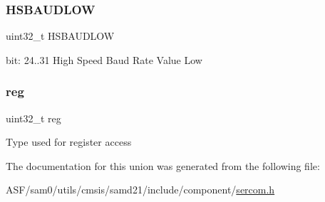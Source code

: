 \subsubsection{\texorpdfstring{HSBAUDLOW}{HSBAUDLOW}}
{\footnotesize\ttfamily uint32\+\_\+t H\+S\+B\+A\+U\+D\+L\+OW}

bit\+: 24..31 High Speed Baud Rate Value Low \mbox{\label{union_s_e_r_c_o_m___i2_c_m___b_a_u_d___type_a6b91636401516a477989a336376d7b40}} 
\subsubsection{\texorpdfstring{reg}{reg}}
{\footnotesize\ttfamily uint32\+\_\+t reg}

Type used for register access 

The documentation for this union was generated from the following file\+:\begin{DoxyCompactItemize}
\item 
A\+S\+F/sam0/utils/cmsis/samd21/include/component/\mbox{\hyperlink{utils_2cmsis_2samd21_2include_2component_2sercom_8h}{sercom.\+h}}\end{DoxyCompactItemize}
